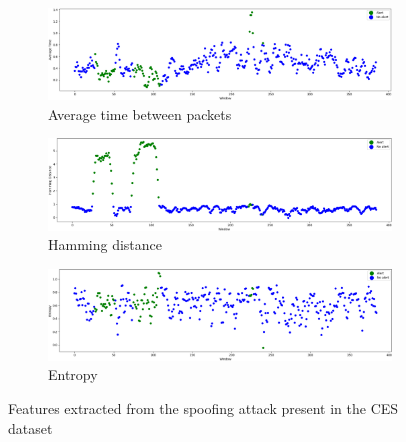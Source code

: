 \begin{figure}
    \centering
    \begin{subfigure}[b]{.6\linewidth}
        \includegraphics[width = \linewidth]{img/parts/app/tests/ces/spoofing/AvgTime.png}
        \caption{Average time between packets}
        \label{subfig:ces_spoofing_avgtime}
    \end{subfigure}
    \begin{subfigure}[b]{.6\linewidth}
        \includegraphics[width = \linewidth]{img/parts/app/tests/ces/spoofing/HammingDist.png}
        \caption{Hamming distance}
        \label{subfig:ces_spoofing_hammingdist}
    \end{subfigure}
    \begin{subfigure}[b]{.6\linewidth}
        \includegraphics[width = \linewidth]{img/parts/app/tests/ces/spoofing/Entropy.png}
        \caption{Entropy}
        \label{subfig:ces_spoofing_entropy}
    \end{subfigure}
    \caption{Features extracted from the spoofing attack present in the CES dataset}
    \label{fig:ces_spoofing}
\end{figure}
